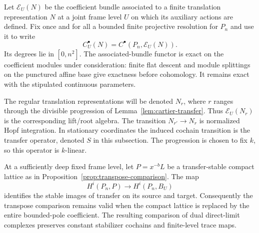 Let $\mathcal E_U(N)$ be the coefficient bundle associated to a finite
translation representation $N$ at a joint frame level $U$ on which its
auxiliary actions are defined.  Fix once and for all a bounded finite
projective resolution for $P_n$ and use it to write
\[
 C_U^\bullet(N)=C^\bullet(P_n,\mathcal E_U(N)).
\]
Its degrees lie in $[0,n^2]$.  The associated-bundle functor is exact on
the coefficient modules under consideration: finite flat descent and
module splittings on the punctured affine base give exactness before
cohomology.  It remains exact with the stipulated continuous parameters.

The regular translation representations will be denoted $N_r$, where
$r$ ranges through the divisible progression of
Lemma~\ref{lem:cartier-transfer}.  Thus $\mathcal E_U(N_r)$ is the
corresponding lift/root algebra.  The transition $N_{r'}\to N_r$ is
normalized Hopf integration.  In stationary coordinates the induced
cochain transition is the transfer operator, denoted $S$ in this
subsection.  The progression is chosen to fix $k$, so this operator is
$k$-linear.

\begin{lemma}
\label{full:stable-cutoff}
At a sufficiently deep fixed frame level, let $P=x^{-b}L$ be a
transfer-stable compact lattice as in
Proposition~\ref{prop:transpose-comparison}.  The map
\[
 H^i(P_n,P)\longrightarrow H^i(P_n,B_U)
\]
identifies the stable images of transfer on its source and target.
Consequently the transpose comparison remains valid when the compact
lattice is replaced by the entire bounded-pole coefficient.
The resulting comparison of dual direct-limit complexes preserves
constant stabilizer cochains and finite-level trace maps.
\end{lemma}


